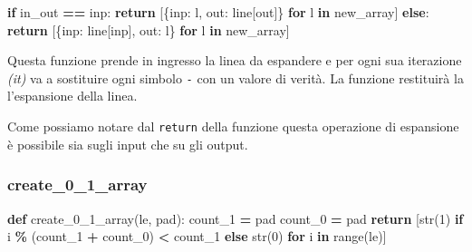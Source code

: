 \documentclass[
  italian,
]{book}
\newenvironment{Shaded}{\begin{snugshade}}{\end{snugshade}}
\newcommand{\BuiltInTok}[1]{#1}
\newcommand{\ControlFlowTok}[1]{\textcolor[rgb]{0.13,0.29,0.53}{\textbf{#1}}}
\newcommand{\DecValTok}[1]{\textcolor[rgb]{0.00,0.00,0.81}{#1}}
\newcommand{\KeywordTok}[1]{\textcolor[rgb]{0.13,0.29,0.53}{\textbf{#1}}}
\newcommand{\NormalTok}[1]{#1}
\newcommand{\OperatorTok}[1]{\textcolor[rgb]{0.81,0.36,0.00}{\textbf{#1}}}
\newcommand{\StringTok}[1]{\textcolor[rgb]{0.31,0.60,0.02}{#1}}
\begin{document}
\begin{Shaded}
\begin{Highlighting}[]
    \ControlFlowTok{if}\NormalTok{ in\_out }\OperatorTok{==} \StringTok{\textquotesingle{}inp\textquotesingle{}}\NormalTok{:}
        \ControlFlowTok{return}\NormalTok{ [\{}\StringTok{\textquotesingle{}inp\textquotesingle{}}\NormalTok{:  l, }\StringTok{\textquotesingle{}out\textquotesingle{}}\NormalTok{:  line[}\StringTok{\textquotesingle{}out\textquotesingle{}}\NormalTok{]\} }\ControlFlowTok{for}\NormalTok{ l }\KeywordTok{in}\NormalTok{ new\_array]}
    \ControlFlowTok{else}\NormalTok{:}
        \ControlFlowTok{return}\NormalTok{ [\{}\StringTok{\textquotesingle{}inp\textquotesingle{}}\NormalTok{:  line[}\StringTok{\textquotesingle{}inp\textquotesingle{}}\NormalTok{], }\StringTok{\textquotesingle{}out\textquotesingle{}}\NormalTok{:  l\} }\ControlFlowTok{for}\NormalTok{ l }\KeywordTok{in}\NormalTok{ new\_array]}
\end{Highlighting}
\end{Shaded}

Questa funzione prende in ingresso la linea da espandere e per ogni sua iterazione \emph{(it)} va a sostituire ogni simbolo \texttt{-} con un valore di verità. La funzione restituirà la l'espansione della linea.

\newpage

Come possiamo notare dal \texttt{return} della funzione questa operazione di espansione è possibile sia sugli input che su gli output.

\hypertarget{create_0_1_array}{%
\subsubsection{create\_0\_1\_array}\label{create_0_1_array}}

\begin{Shaded}
\begin{Highlighting}[]
\KeywordTok{def}\NormalTok{ create\_0\_1\_array(le, pad):}
\NormalTok{    count\_1 }\OperatorTok{=}\NormalTok{ pad}
\NormalTok{    count\_0 }\OperatorTok{=}\NormalTok{ pad}
    \ControlFlowTok{return}\NormalTok{ [}\BuiltInTok{str}\NormalTok{(}\DecValTok{1}\NormalTok{) }\ControlFlowTok{if}\NormalTok{ i }\OperatorTok{\%}\NormalTok{ (count\_1 }\OperatorTok{+}\NormalTok{ count\_0) }\OperatorTok{\textless{}}\NormalTok{ count\_1 }
        \ControlFlowTok{else} \BuiltInTok{str}\NormalTok{(}\DecValTok{0}\NormalTok{) }\ControlFlowTok{for}\NormalTok{ i }\KeywordTok{in} \BuiltInTok{range}\NormalTok{(le)]}
\end{Highlighting}
\end{Shaded}
\end{document}
